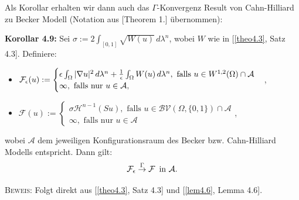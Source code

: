 Als Korollar erhalten wir dann auch das \(\Gamma\)-Konvergenz Result von Cahn-Hilliard zu Becker Modell (Notation aus \cite{ambrosio2000variational}[Theorem 1.] übernommen):\\[0.5cm]
\colorbox{generalYellow}{\begin{minipage}{16cm}{\textcolor{black}{}{\label{kor4.9}}}
\textbf{Korollar 4.9:} Sei \(\sigma := 2\int_{[0,1]} \sqrt{W(u)} \,d\lambda^n\), wobei \(W\) wie in [\ref{theo4.3}, Satz 4.3]. Definiere:
\begin{itemize}
    \item \(\mathcal{F}_{\epsilon}(u) := \begin{cases}
    \epsilon \int_{\Omega} |\nabla u|^2 \, d\lambda^n + \frac{1}{\epsilon} \int_{\Omega} W(u) \,d\lambda^n, \text{ falls }u \in W^{1,2}(\Omega) \cap \mathcal{A} \\
    \infty, \text{ falls nur }u \in \mathcal{A},
    \end{cases}\),
    \item \(\mathcal{F}(u) := \begin{cases}
    \sigma \mathcal{H}^{n-1}(Su), \text{ falls }u \in \mathcal{BV}(\Omega, \{0,1\}) \cap \mathcal{A} \\
    \infty, \text{ falls nur }u \in \mathcal{A} 
    \end{cases}\),
\end{itemize}
wobei \(\mathcal{A}\) dem jeweiligen Konfigurationsraum des Becker bzw. Cahn-Hilliard Modells entspricht. Dann gilt:
\begin{equation}
    \mathcal{F}_{\epsilon} \stackrel{\Gamma}{\to} \mathcal{F} \, \text{ in }\mathcal{A}.
\end{equation}
\end{minipage}}

\textsc{Beweis:} Folgt direkt aus [\ref{theo4.3}, Satz 4.3] und [\ref{lem4.6}, Lemma 4.6]. \QEDB
